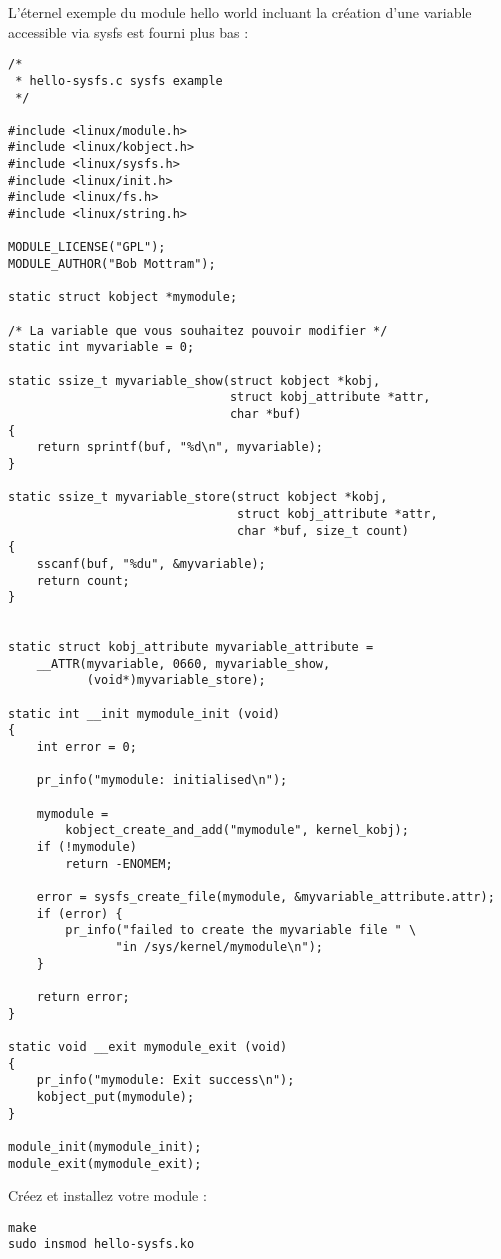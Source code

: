 \documentclass[11pt]{article}
\begin{document}
L'éternel exemple du module hello world incluant la création d'une variable accessible via sysfs est fourni plus bas :

\begin{verbatim}
/*
 * hello-sysfs.c sysfs example
 */

#include <linux/module.h>
#include <linux/kobject.h>
#include <linux/sysfs.h>
#include <linux/init.h>
#include <linux/fs.h>
#include <linux/string.h>

MODULE_LICENSE("GPL");
MODULE_AUTHOR("Bob Mottram");

static struct kobject *mymodule;

/* La variable que vous souhaitez pouvoir modifier */
static int myvariable = 0;

static ssize_t myvariable_show(struct kobject *kobj,
                               struct kobj_attribute *attr,
                               char *buf)
{
    return sprintf(buf, "%d\n", myvariable);
}

static ssize_t myvariable_store(struct kobject *kobj,
                                struct kobj_attribute *attr,
                                char *buf, size_t count)
{
    sscanf(buf, "%du", &myvariable);
    return count;
}


static struct kobj_attribute myvariable_attribute =
    __ATTR(myvariable, 0660, myvariable_show,
           (void*)myvariable_store);

static int __init mymodule_init (void)
{
    int error = 0;

    pr_info("mymodule: initialised\n");

    mymodule =
        kobject_create_and_add("mymodule", kernel_kobj);
    if (!mymodule)
        return -ENOMEM;

    error = sysfs_create_file(mymodule, &myvariable_attribute.attr);
    if (error) {
        pr_info("failed to create the myvariable file " \
               "in /sys/kernel/mymodule\n");
    }

    return error;
}

static void __exit mymodule_exit (void)
{
    pr_info("mymodule: Exit success\n");
    kobject_put(mymodule);
}

module_init(mymodule_init);
module_exit(mymodule_exit);
\end{verbatim}

Créez et installez votre module :

\begin{verbatim}
make
sudo insmod hello-sysfs.ko
\end{verbatim}
\end{document}
